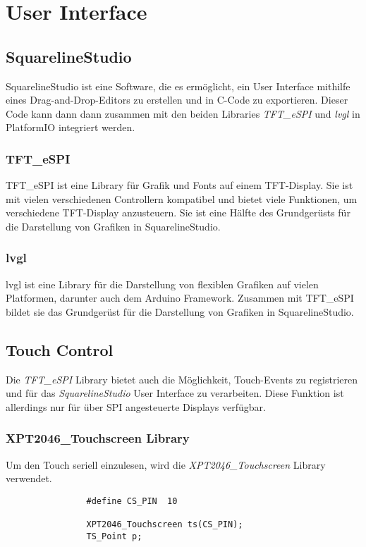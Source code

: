 \section{User Interface}
        \subsection{SquarelineStudio}
        SquarelineStudio ist eine Software, die es ermöglicht, ein 
        User Interface mithilfe eines Drag-and-Drop-Editors zu erstellen und
        in C-Code zu exportieren. Dieser Code kann dann dann zusammen mit den 
        beiden Libraries \textit{TFT\_eSPI} und \textit{lvgl} in PlatformIO
        integriert werden.

            \subsubsection{TFT\_eSPI}
            TFT\_eSPI ist eine Library für Grafik und Fonts auf einem TFT-Display.
            Sie ist mit vielen verschiedenen Controllern kompatibel und bietet
            viele Funktionen, um verschiedene TFT-Display anzusteuern.
            Sie ist eine Hälfte des Grundgerüsts für die Darstellung von Grafiken 
            in SquarelineStudio.

            \subsubsection{lvgl}
            lvgl ist eine Library für die Darstellung von flexiblen Grafiken
            auf vielen Platformen, darunter auch dem Arduino Framework.
            Zusammen mit TFT\_eSPI bildet sie das Grundgerüst für die Darstellung
            von Grafiken in SquarelineStudio.
        \subsection{Touch Control}
        Die \textit{TFT\_eSPI} Library bietet auch die Möglichkeit, Touch-Events
        zu registrieren und für das \textit{SquarelineStudio} User Interface zu
        verarbeiten. Diese Funktion ist allerdings nur für über SPI angesteuerte
        Displays verfügbar.
            \subsubsection{XPT2046\_Touchscreen Library}
            Um den Touch seriell einzulesen, wird die \textit{XPT2046\_Touchscreen}
            Library verwendet. 

            \begin{lstlisting}
                #define CS_PIN  10

                XPT2046_Touchscreen ts(CS_PIN);
                TS_Point p;
            \end{lstlisting}
